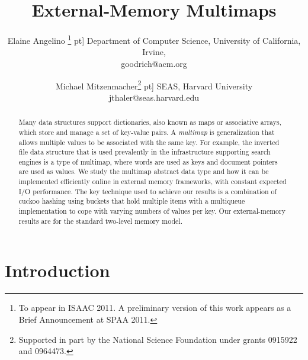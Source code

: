 \documentclass[11pt,letterpaper]{article}
\begin{document}
\renewenvironment{proof}{\noindent{\bf Proof:}}{\hspace*{\fill}\rule{6pt}{6pt}\bigskip}

\title{External-Memory Multimaps}
\author{Elaine Angelino \thanks{To appear in ISAAC 2011. A preliminary version of this work appears as a Brief Announcement at SPAA 2011.}  \6pt]
Department of Computer Science, University of California, Irvine,\\
goodrich@acm.org
 \and 
 Michael Mitzenmacher\thanks{Supported in part by 
the National Science Foundation under grants 0915922 and 0964473.} \6pt]
SEAS, Harvard University\\
jthaler@seas.harvard.edu 
}

\date{}
\maketitle 

\vspace{-0.7 cm}

\begin{abstract}
Many data structures support dictionaries, also known as maps or
associative arrays, which store and manage a set of key-value pairs.
A \emph{multimap} is generalization that allows multiple values to be
associated with the same key.  
For example, the inverted file data structure that is used
prevalently in the infrastructure supporting search engines is a
type of multimap, where words are used as keys and document pointers
are used as values.
We study the multimap abstract data
type and how it can be implemented efficiently online in external memory frameworks, with constant expected I/O performance.  
The key technique used to
achieve our results is a combination of cuckoo hashing using buckets that hold
multiple items with a multiqueue implementation to
cope with varying numbers of values per key.
Our external-memory results are for the standard two-level memory
model.\end{abstract}





\section{Introduction}
\end{document}

